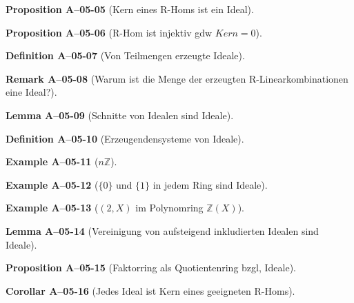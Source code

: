 \documentclass[10pt, letterpaper]{article}
\newcommand{\Z}{\mathbb{Z}}
\newcommand{\CustomHeading}[3]{%
  \par\medskip\noindent%
  \textbf{#1 #2} \textnormal{(#3)}.\enskip%
}
\newenvironment{DEF}[2]{\CustomHeading{Definition}{#1}{#2}}{}
\newenvironment{PROP}[2]{\CustomHeading{Proposition}{#1}{#2}}{}
\newenvironment{LEM}[2]{\CustomHeading{Lemma}{#1}{#2}}{}
\newenvironment{KORO}[2]{\CustomHeading{Corollar}{#1}{#2}}{}
\newenvironment{REM}[2]{\CustomHeading{Remark}{#1}{#2}}{}
\newenvironment{EXA}[2]{\CustomHeading{Example}{#1}{#2}}{}
\begin{document}
\begin{PROP}{A--05-05}{Kern eines R-Homs ist ein Ideal}
\end{PROP}

\begin{PROP}{A--05-06}{R-Hom ist injektiv gdw $Kern = 0$}
\end{PROP}

\begin{DEF}{A--05-07}{Von Teilmengen erzeugte Ideale}
\end{DEF}

\begin{REM}{A--05-08}{Warum ist die Menge der erzeugten R-Linearkombinationen eine Ideal?}
\end{REM}

\begin{LEM}{A--05-09}{Schnitte von Idealen sind Ideale}
\end{LEM}

\begin{DEF}{A--05-10}{Erzeugendensysteme von Ideale}
\end{DEF}

\begin{EXA}{A--05-11}{$n\Z$}
\end{EXA}

\begin{EXA}{A--05-12}{$\{0\}$ und $\{1\}$ in jedem Ring sind Ideale}
\end{EXA}

\begin{EXA}{A--05-13}{$(2,X)$ im Polynomring $\Z(X)$}
\end{EXA}

\begin{LEM}{A--05-14}{Vereinigung von aufsteigend inkludierten Idealen sind Ideale}
\end{LEM}

\begin{PROP}{A--05-15}{Faktorring als Quotientenring bzgl, Ideale}
\end{PROP}

\begin{KORO}{A--05-16}{Jedes Ideal ist Kern eines geeigneten R-Homs}
\end{KORO}
\end{document}
